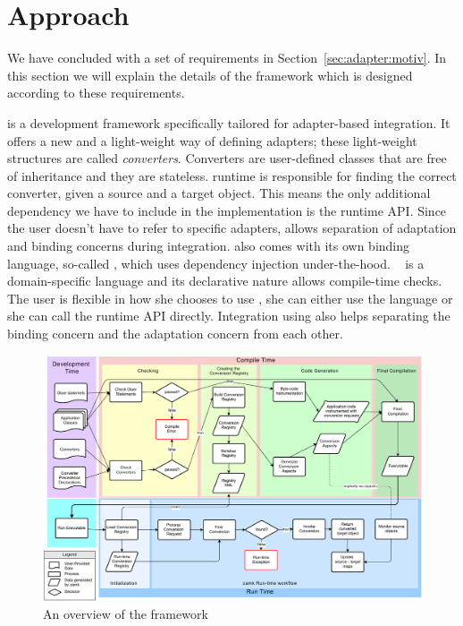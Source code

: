 \section{Approach}
We have concluded with a set of requirements in Section~\ref{sec:adapter:motiv}. In this section we will explain the details of the \zamk framework which is designed according to these requirements. 

\zamk is a development framework specifically tailored for adapter-based integration. 
It offers a new and a light-weight way of defining adapters; these light-weight structures are called \emph{converters}. 
Converters are user-defined classes that are free of inheritance and they are stateless. 
\zamk runtime is responsible for finding the correct converter, given a source and a target object. 
This means the only additional dependency we have to include in the implementation is the \zamk runtime API. 
Since the user doesn't have to refer to specific adapters, \zamk allows separation of adaptation and binding concerns during integration.
\zamk also comes with its own binding language, so-called \gluer, which uses dependency injection under-the-hood. 
\gluer~ is a domain-specific language and its declarative nature allows compile-time checks.
The user is flexible in how she chooses to use \zamk, she can either use the \gluer language or she can call the runtime API directly. 
Integration using \zamk also helps separating the binding concern and the adaptation concern from each other.  

\begin{figure}
\includegraphics[height=\textwidth, angle=90]{chapteradapters/bigpicture.pdf}
\caption{An overview of the \zamk framework}
\label{fig:framework}
\end{figure}

